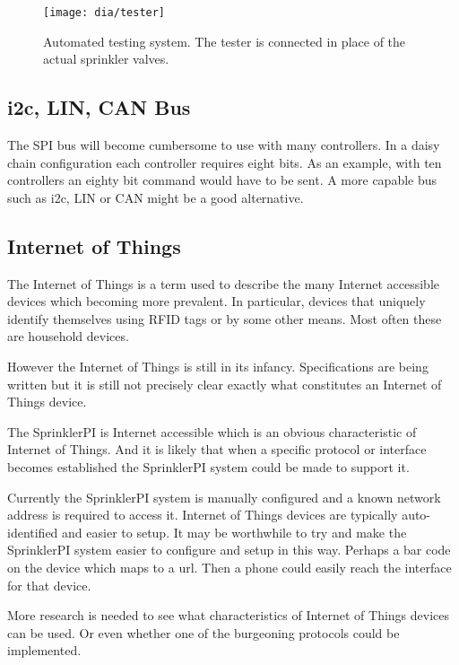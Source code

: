 \documentclass{article}
\begin{document}
\begin{figure}[htbp!]
\begin{center}
\texttt{[image: dia/tester]}
\end{center}
\caption{Automated testing system.
The tester is connected in place of the actual sprinkler valves.}
\label{fig:tester}
\end{figure}

\FloatBarrier
\subsection{i2c, LIN, CAN Bus}

The SPI bus will become cumbersome to use with many
controllers.
In a daisy chain configuration each controller requires
eight bits.
As an example, with ten controllers an eighty bit command
would have to be sent.
A more capable bus such as i2c, LIN or CAN might be a good alternative.

\subsection{Internet of Things}

The Internet of Things\autocite{wiki:iot} is a term used to describe
the many Internet accessible devices which becoming more prevalent.
In particular, devices that uniquely identify themselves using RFID
tags or by some other means.
Most often these are household devices.

However the Internet of Things is still in its infancy.
Specifications are being written but it is still not precisely
clear exactly what constitutes an Internet of Things device.

The SprinklerPI is Internet accessible which is an obvious
characteristic of Internet of Things.
And it is likely that when a specific protocol or interface becomes
established the SprinklerPI system could be made to support it.

Currently the SprinklerPI system is manually configured and a known
network address is required to access it.
Internet of Things devices are typically auto-identified and easier
to setup.
It may be worthwhile to try and make the SprinklerPI system easier
to configure and setup in this way.
Perhaps a bar code on the device which maps to a url.
Then a phone could easily reach the interface for that device.

More research is needed to see what characteristics of Internet of Things
devices can be used.
Or even whether one of the burgeoning protocols could be implemented.
\end{document}
